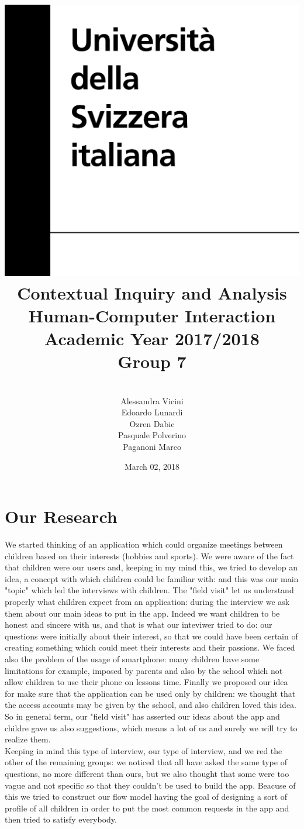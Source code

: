 \documentclass[12pt]{report}
\title {
	\includegraphics[width = .2\linewidth]{University-of-Lugano.png} \break \break
	{\bf\Huge Contextual Inquiry and Analysis}
	\\\large Human-Computer Interaction
	\\\small Academic Year 2017/2018 \break
	\\\large \textbf{Group 7}}
\author{
	\\\large Alessandra Vicini \\ Edoardo Lunardi \\ Ozren Dabic \\ Pasquale Polverino \\ Paganoni Marco}
\date{March 02, 2018}
\begin{document}
	\pagestyle{empty}
	\maketitle
	\section*{\huge Our Research}
	We started thinking of an application which could organize meetings
	between children based on their interests (hobbies and sports). We
	were aware of the fact that children were our users and, keeping in
	my mind this, we tried to develop an idea, a concept with which
	children could be familiar with: and this was our main "topic" which led the
	interviews with children. The "field visit" let us understand properly
	what children expect from an application: during the interview we ask
	them about our main ideas to put in the app. Indeed we want children
	to be honest and sincere with us, and that is what our inteviwer tried
	to do: our questions were initially about their interest, so that
	we could have been certain of creating something which could meet
	their interests and their passions. We faced also the problem of the
	usage of smartphone: many children have some limitations for example,
	imposed by parents and also by the school which not allow children
	to use their phone on lessons time. Finally we proposed our idea for
	make sure that the application can be used only by children: we
	thought that the access accounts may be given by the school, and also
	children loved this idea. So in general term, our "field visit" has
	asserted our ideas about the app and childre gave us also suggestions,
	which means a lot of us and surely we will try to realize them.\\

	Keeping in mind this type of interview, our type of interview, and we
	red the other of the remaining groups: we noticed that all have asked
	the same type of questions, no more different than ours, but we also
	thought that some were too vague and not specific so that they couldn't
	be used to build the app. Beacuse of this we tried to construct our
	flow model having the goal of designing a sort of profile of all children
	in order to put the most common requests in the app and then tried to
	satisfy everybody.\\
\end{document}
